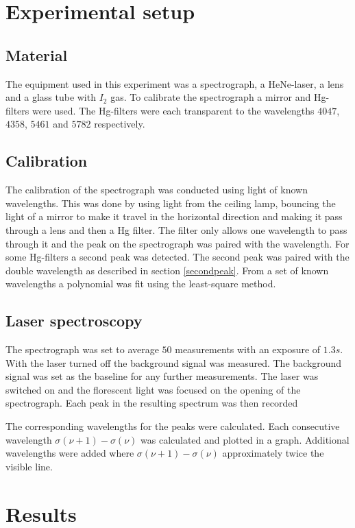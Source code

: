 \documentclass[12pt]{article}
\begin{document}
\section{Experimental setup}
\subsection{Material}
The equipment used in this experiment was a spectrograph, a HeNe-laser, a lens and a glass tube with $I_2$ gas. To calibrate the spectrograph a mirror and Hg-filters were used. The Hg-filters were each transparent to the wavelengths $4047$, $4358$, $5461$ and $5782$ respectively.

\subsection{Calibration}
The calibration of the spectrograph was conducted using light of known wavelengths. This was done by using light from the ceiling lamp, bouncing the light of a mirror to make it travel in the horizontal direction and making it pass through a lens and then a Hg filter. The filter only allows one wavelength to pass through it and the peak on the spectrograph was paired with the wavelength. For some Hg-filters a second peak was detected. The second peak was paired with the double wavelength as described in section \ref{secondpeak}. From a set of known wavelengths a polynomial was fit using the least-square method.


\subsection{Laser spectroscopy}
The spectrograph was set to average $50$ measurements with an exposure of $1.3 s$. With the laser turned off the background signal was measured. The background signal was set as the baseline for any further measurements. The laser was switched on and the florescent light was focused on the opening of the spectrograph. Each peak in the resulting spectrum was then recorded

The corresponding wavelengths for the peaks were calculated. Each consecutive wavelength $\sigma(\nu + 1) - \sigma(\nu)$ was calculated and plotted in a graph. Additional wavelengths were added where $\sigma(\nu + 1) - \sigma(\nu)$ approximately twice the visible line.

\pagebreak
\section{Results}
\end{document}
